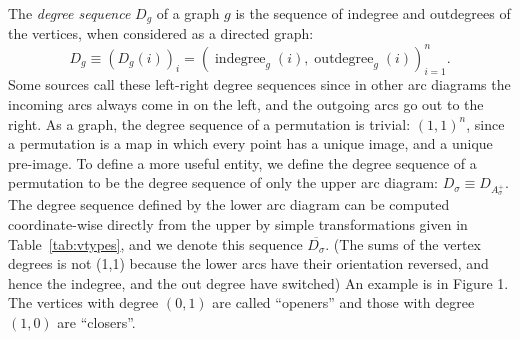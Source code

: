 \documentclass{amsart}
\begin{document}
The \emph{ degree sequence} $D_g $ of a graph $g$ is the sequence of indegree and outdegrees of the vertices, when considered as a directed graph:
\[D_g \equiv(D_g(i))_i=\left(\operatorname{indegree}_{g}(i), \operatorname{outdegree}_{g}(i)\right)_{i=1}^n.\] Some sources call these left-right degree sequences since in other arc diagrams the incoming arcs always come in on the left, and the outgoing arcs go out to the right. 
As a graph, the degree sequence of a permutation is trivial: $(1,1)^n$, since a permutation is a map in which every point has a unique image, and a unique pre-image. To define a more useful entity, we define the degree sequence of a permutation to be the degree sequence of only the upper arc diagram: $D_\sigma\equiv D_{A_\sigma^+}$. The degree sequence defined by the lower arc diagram can be computed coordinate-wise directly from the upper by simple transformations given in Table~\ref{tab:vtypes}, and we denote this sequence $\overline{D_\sigma}$. (The sums of the vertex degrees is not (1,1) because the lower arcs have their orientation reversed, and hence the indegree, and the out degree have switched)
An example is in Figure 1. The vertices with degree $(0,1)$  are called ``openers'' and those with degree $(1,0)$ are ``closers''. 
\end{document}
